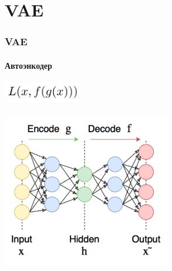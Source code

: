 \documentclass[10pt]{beamer}
\begin{document}
\section{VAE}
\begin{frame}
\frametitle{VAE}
\framesubtitle{Автоэнкодер}

\begin{center}
    \includegraphics[width=0.25\textwidth]{images/ae_term.png} \\
    \vskip-5mm \\
    \includegraphics[width=0.55\textwidth]{images/ae.png}
\end{center}

\end{frame}
\end{document}

